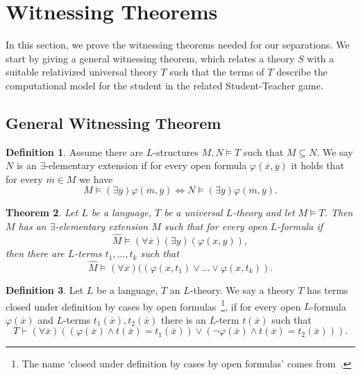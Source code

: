 \documentclass[11pt]{article}
\newtheorem{theorem}{Theorem}[section]
\theoremstyle{definition}
\theoremstyle{definition}
\newtheorem{definition}[theorem]{Definition}
\theoremstyle{remark}
\begin{document}
\section{Witnessing Theorems}\label{sec:witnessing}

In this section, we prove the witnessing theorems needed for our separations. We start by giving a general witnessing theorem, which relates a theory $S$ with a suitable relativized universal theory $T$ such that the terms of $T$ describe the computational model for the student in the related Student-Teacher game.

\subsection{General Witnessing Theorem}

\begin{definition}
    Assume there are $L$-structures $M,N\models T$ such that $M\subseteq N$. We say $N$ is an $\exists$-elementary extension if for every open formula $\varphi(\overline x,\overline y)$ it holds that for every $\overline m\in M$ we have
    \[M\models (\exists \overline y)\varphi(\overline m,\overline y)\iff N\models (\exists \overline y)\varphi(\overline m,\overline y).\]
\end{definition}

\begin{theorem}\cite[Theorems 3.2 and 3.3]{AVIGAD2002219}\label{theoremherbrandsaturated}
    Let $L$ be a language, $T$ be a universal $L$-theory and let $M\models T$. Then $M$ has an $\exists$-elementary extension $\hat M$ such that for every open $L$-formula if
    \[\hat M\models (\forall \overline x)(\exists y)(\varphi(x,y)),\]
    then there are $L$-terms $t_1,\dots,t_k$ such that
    \[\hat M\models (\forall \overline x)((\varphi(x,t_1)\lor \dots \lor \varphi(x,t_k)).\]
\end{theorem}

\begin{definition}
    Let $L$ be a language, $T$ an $L$-theory. We say a theory $T$ has terms closed under definition by cases by open formulas~\footnote{The name `closed under definition by cases by open formulas' comes from~\cite{forcing}.}, if for every open $L$-formula $\varphi(\overline x)$ and $L$-terms $t_1(\overline x),t_2(\overline x)$ there is an $L$-term $t(\overline x)$ such that
    \[T\vdash (\forall \overline x)((\varphi(\overline x)\land t(\overline x)=t_1(\overline x))\lor (\lnot \varphi(\overline x)\land t(\overline x)=t_2(\overline x))).\]
\end{definition}
\end{document}
